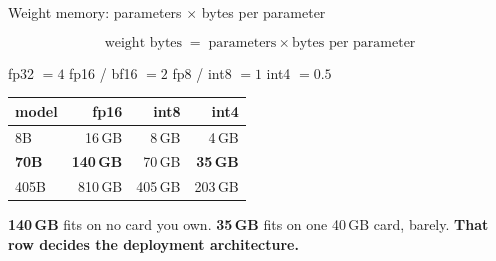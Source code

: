 \documentclass[aspectratio=169,10pt]{beamer}
\newcommand{\emphc}[1]{\textcolor{accent}{\textbf{#1}}}
\newcommand{\warnc}[1]{\textcolor{warn}{\textbf{#1}}}
\newcommand{\llmbase}{%
  \node[llmbox] (PF) at (0, 0) {Prefill};
  \node[llmbox] (KV) at (1.05, 0) {KV};
  \node[llmbox] (DC) at (1.95, 0) {Decode};
  \node[llmbox] (WP) at (0, -0.45) {Weights};
  \node[llmbox] (WD) at (1.95, -0.45) {Weights};
  \draw[llmar] (PF)--(KV); \draw[llmar] (KV)--(DC);
  \draw[llmar] (WP)--(PF); \draw[llmar] (WD)--(DC);
}
\newcommand{\llmoverlay}[1]{}  %
\newcommand{\llmdiagW}{\llmoverlay{\begin{tikzpicture}[scale=0.65]\llmbase
  \node[llmbox, llmhl] at (0,-0.45) {Weights};
  \node[llmbox, llmhl] at (1.95,-0.45) {Weights};\end{tikzpicture}}}
\begin{document}
\begin{frame}{Weight memory: parameters $\times$ bytes per parameter}
  \llmdiagW
  \begin{equation*}
    \text{weight bytes} \;=\; \text{parameters} \times \text{bytes per parameter}
  \end{equation*}
  \begin{center}\small
    fp32 $=4$ \quad fp16 / bf16 $=2$ \quad fp8 / int8 $=1$ \quad int4 $=0.5$
  \end{center}
  \vspace{0.4em}
  \begin{center}
    \begin{tabular}{lrrr}
      \toprule
      model & fp16 & int8 & int4 \\
      \midrule
      8B  &  16\,GB &  8\,GB & 4\,GB \\
      \textbf{70B} & \warnc{140\,GB} & 70\,GB & \emphc{35\,GB} \\
      405B & 810\,GB & 405\,GB & 203\,GB \\
      \bottomrule
    \end{tabular}
  \end{center}
  \vspace{0.5em}
  \warnc{140\,GB} fits on no card you own.
  \emphc{35\,GB} fits on one 40\,GB card, barely.
  \textbf{That row decides the deployment architecture.}
\end{frame}
\end{document}
